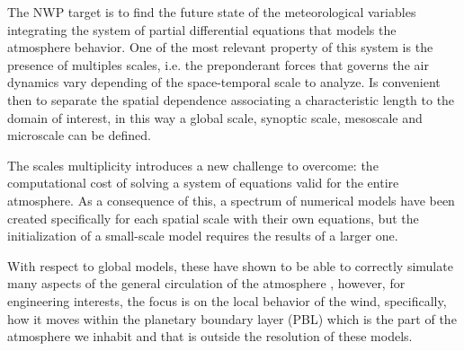 The NWP target is to find the future state of the meteorological variables integrating the system of partial differential equations that models the atmosphere behavior. One of the most relevant property of this system is the presence of multiples scales, i.e. the preponderant forces that governs the air dynamics vary depending of the space-temporal scale to analyze. Is convenient then to separate the spatial dependence associating a characteristic length to the domain of interest, in this way a global scale, synoptic scale, mesoscale and microscale can be defined.

The scales multiplicity introduces a new challenge to overcome: the computational cost of solving a system of equations valid for the entire atmosphere. As a consequence of this, a spectrum of numerical models have been created specifically for each spatial scale with their own equations, but the initialization of a small-scale model requires the results of a larger one.

With respect to global models, these have shown to be able to correctly simulate many aspects of the general circulation of the atmosphere \citep{stocker2013climate}, however, for engineering interests, the focus is on the local behavior of the wind, specifically, how it moves within the planetary boundary layer (PBL) which is the part of the atmosphere we inhabit and that is outside the resolution of these models.


